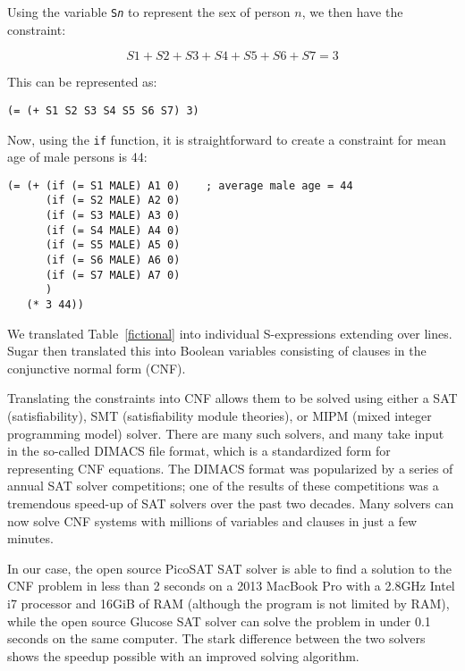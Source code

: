 \documentclass[runningheads]{llncs}
\begin{document}
Using the variable \texttt{S\emph{n}} to represent the sex of person
$n$, we then have the constraint:

\begin{equation}
S1 + S2 + S3 + S4 + S5 + S6 + S7 = 3
\end{equation}

This can be represented as:

\begin{Verbatim}
(= (+ S1 S2 S3 S4 S5 S6 S7) 3)
\end{Verbatim}

Now, using the \texttt{if} function, it is straightforward to create a constraint for
mean age of male persons is 44:

\begin{Verbatim}
(= (+ (if (= S1 MALE) A1 0)    ; average male age = 44
      (if (= S2 MALE) A2 0)
      (if (= S3 MALE) A3 0)
      (if (= S4 MALE) A4 0)
      (if (= S5 MALE) A5 0)
      (if (= S6 MALE) A6 0)
      (if (= S7 MALE) A7 0)
      )
   (* 3 44))
\end{Verbatim}

We translated Table~\ref{fictional} into \NumSExpressions{} individual
S-expressions extending over \NumConstraintLines{} lines. Sugar then
translated this into \NumVariables Boolean variables consisting of
\NumClauses clauses in the conjunctive normal form (CNF). 

Translating the constraints into CNF allows them to be solved using
either a SAT (satisfiability), SMT (satisfiability module theories),
or MIPM (mixed integer programming model) solver. There are many such
solvers, and many take input in the so-called DIMACS file
format, which is a standardized form for representing CNF equations. 
The DIMACS format was popularized by a series of annual SAT solver
competitions; one of the results of these competitions was a
tremendous speed-up of SAT solvers over the past two decades. Many
solvers can now solve CNF systems with millions of variables and
clauses in just a few minutes.

In our case, the open source
PicoSAT\cite{Biere_picosatessentials} SAT solver is able to find a
solution to the CNF problem in less than 2 seconds on a 2013 MacBook
Pro with a 2.8GHz Intel i7 processor and 16GiB of RAM (although the
program is not limited by RAM), while the open source Glucose SAT solver
can solve the problem in under 0.1 seconds on the same computer. The
stark difference between the two solvers shows the speedup possible
with an improved solving algorithm. 
\end{document}
